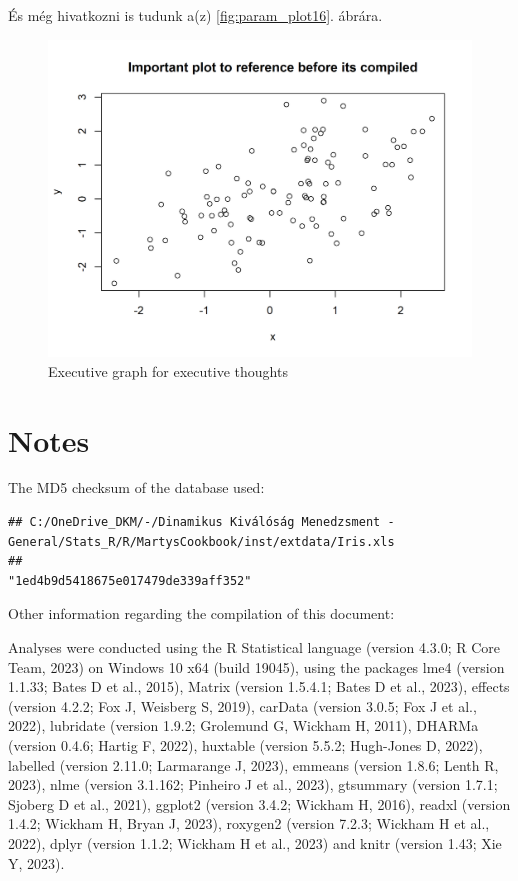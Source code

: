 \documentclass[
]{article}
\begin{document}
És még hivatkozni is tudunk a(z) \ref{fig:param_plot16}. ábrára.

\begin{figure}[H]

{\centering \includegraphics[width=0.9\linewidth]{cookbook_files/figure-latex/referenced_chunk-1} 

}

\caption{Executive graph for executive thoughts}\label{fig:referenced_chunk}
\end{figure}

\hypertarget{notes}{%
\section{Notes}\label{notes}}

The MD5 checksum of the database used:

\begin{verbatim}
## C:/OneDrive_DKM/-/Dinamikus Kiválóság Menedzsment - General/Stats_R/R/MartysCookbook/inst/extdata/Iris.xls 
##                                                                         "1ed4b9d5418675e017479de339aff352"
\end{verbatim}

Other information regarding the compilation of this document:

Analyses were conducted using the R Statistical language (version 4.3.0;
R Core Team, 2023) on Windows 10 x64 (build 19045), using the packages
lme4 (version 1.1.33; Bates D et al., 2015), Matrix (version 1.5.4.1;
Bates D et al., 2023), effects (version 4.2.2; Fox J, Weisberg S, 2019),
carData (version 3.0.5; Fox J et al., 2022), lubridate (version 1.9.2;
Grolemund G, Wickham H, 2011), DHARMa (version 0.4.6; Hartig F, 2022),
huxtable (version 5.5.2; Hugh-Jones D, 2022), labelled (version 2.11.0;
Larmarange J, 2023), emmeans (version 1.8.6; Lenth R, 2023), nlme
(version 3.1.162; Pinheiro J et al., 2023), gtsummary (version 1.7.1;
Sjoberg D et al., 2021), ggplot2 (version 3.4.2; Wickham H, 2016),
readxl (version 1.4.2; Wickham H, Bryan J, 2023), roxygen2 (version
7.2.3; Wickham H et al., 2022), dplyr (version 1.1.2; Wickham H et al.,
2023) and knitr (version 1.43; Xie Y, 2023).
\end{document}

